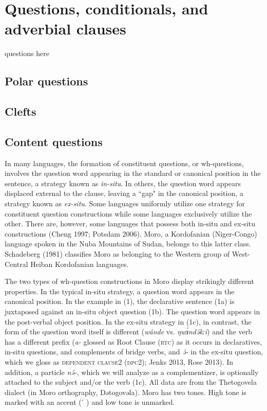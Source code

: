 
\chapter{Questions, conditionals, and adverbial clauses}\label{chapter:questions}

questions here

\section{Polar questions}\label{ynquestion}



\section{Clefts}\label{clefts}

\section{Content questions}\label{content}

In many languages, the formation of constituent questions, or wh-questions, involves the question word appearing in the standard or canonical position in the sentence, a strategy known as \textit{in-situ}. In others, the question word appears displaced external to the clause, leaving a ``gap" in the canonical position, a strategy known as \textit{ex-situ}.  Some languages uniformly utilize one strategy for constituent question constructions while some languages exclusively utilize the other. There are, however, some languages that possess both in-situ and ex-situ constructions (Cheng 1997; Potsdam 2006). Moro, a Kordofanian (Niger-Congo) language spoken in the Nuba Mountains of Sudan, belongs to this latter class.  Schadeberg (1981) classifies Moro as belonging to the Western group of West-Central Heiban Kordofanian languages. 

The two types of wh-question constructions in Moro display strikingly different properties. In the typical in-situ strategy, a question word appears in the canonical position. In the example in (1), the declarative sentence (1a) is juxtaposed against an in-situ object question (1b). The question word appears in the post-verbal object position. In the ex-situ strategy in (1c), in contrast, the form of the question word itself is different (\textit{wánde} vs. \textit{ŋwɜ́ndə́kːi}) and the verb has a different prefix (\textit{a-} glossed as Root Clause (\textsc{rtc}) as it occurs in declaratives, in-situ questions, and complements of bridge verbs, and \textit{ə́-} in the ex-situ question, which we gloss as \textsc{dependent clause}2 (\textsc{dpc}2); Jenks 2013, Rose 2013). In addition, a particle \textit{nə́-}, which we will analyze as a complementizer, is optionally attached to the subject and/or the verb (1c). All data are from the Thetogovela dialect (in Moro orthography, Dətogovəla).  Moro has two tones. High tone is marked with an accent (\hspace{2pt}  ́ ) and low tone is unmarked.

